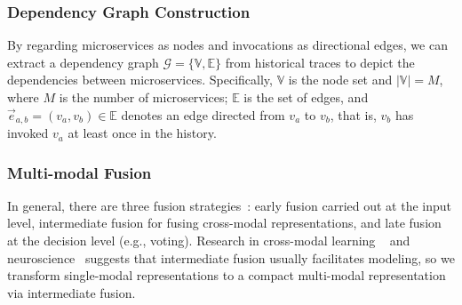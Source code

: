 \subsubsection{Dependency Graph Construction}
By regarding microservices as nodes and invocations as directional edges, we can extract a dependency graph $\mathcal{G}=\{\mathbb{V}, \mathbb{E}\}$ from historical traces to depict the dependencies between microservices. 
Specifically, 
$\mathbb{V}$ is the node set and $|\mathbb{V}|=M$, where $M$ is the number of microservices; 
$\mathbb{E}$ is the set of edges, and $\vec{e}_{a,b}=(v_a, v_b) \in \mathbb{E}$ denotes an edge directed from $v_a$ to $v_b$, that is, $v_b$ has invoked $v_a$ at least once in the history.

\subsubsection{Multi-modal Fusion}\label{sec:method:fuse}
In general, there are three fusion strategies~\cite{fusion}: early fusion carried out at the input level, intermediate fusion for fusing cross-modal representations, and late fusion at the decision level (e.g., voting). 
Research in cross-modal learning ~\cite{feifei14fusion, NIPS16fusion} and neuroscience~\cite{Neuro19fusion, Multisensory21fusion} suggests that intermediate fusion usually facilitates modeling, so we transform single-modal representations to a compact multi-modal representation via intermediate fusion.

